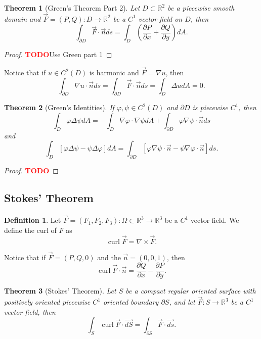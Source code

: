 \documentclass{article}
\theoremstyle{plain}
\newtheorem{theorem}{Theorem}[subsection]
\theoremstyle{definition}
\newtheorem*{definition}{Definition}
\newcommand{\R}{\mathbb{R}}
\DeclareMathOperator{\curl}{curl}
\newcommand{\td}{\textcolor{red}{\textbf{TODO}}}
\begin{document}
\begin{theorem}[Green's Theorem Part 2]
    Let $D \subset \R^2$ be a piecewise smooth domain and $\vec{F} = (P, Q) : D \to \R^2$ be a $C^1$ vector field on $D$, then
    $$\int_{\partial D}\vec{F}\cdot \vec{n}ds = \int_D \left(\frac{\partial P}{\partial x} + \frac{\partial Q}{\partial y}\right)dA.$$
\end{theorem}

\begin{proof}
    \td Use Green part 1
\end{proof}

Notice that if $u \in C^2(D)$ is harmonic and $\vec{F} = \nabla u$, then 
$$\int_{\partial D}\nabla u \cdot \vec{n} ds = \int_{\partial D} \vec{F}\cdot \vec{n} ds = \int_D \Delta u dA = 0.$$

\begin{theorem}[Green's Identities]
    If $\varphi, \psi \in C^2(D)$ and $\partial D$ is piecewise $C^1$, then
    $$\int_D \varphi \Delta \psi dA = - \int_D \nabla \varphi \cdot \nabla \psi dA + \int_{\partial D} \varphi \nabla \psi \cdot \vec{n} ds$$
    and 
    $$\int_D [\varphi \Delta \psi - \psi \Delta \varphi]dA = \int_{\partial D}[\varphi \nabla \psi \cdot \vec{n} - \psi \nabla \varphi \cdot \vec{n}]ds.$$
\end{theorem}

\begin{proof}
    \td 
\end{proof}

\subsection{Stokes' Theorem}

\begin{definition}
    Let $\vec{F} = (F_1, F_2, F_3) : \Omega \subset \R^3 \to \R^3$ be a $C^1$ vector field. We define the curl of $F$ as
    $$\curl \vec{F} = \nabla \times \vec{F}.$$
\end{definition}

Notice that if $\vec{F} = (P, Q, 0)$ and the $\vec{n} = (0,0,1)$, then
$$\curl \vec{F} \cdot \vec{n} = \frac{\partial Q}{\partial x} - \frac{\partial P}{\partial y}.$$

\begin{theorem}[Stokes' Theorem]
    Let $S$ be a compact regular oriented surface with positively oriented piecewise $C^1$ oriented boundary $\partial S$, and let $\vec{F} : S \to \R^3$ be a $C^1$ vector field, then
    $$\int_S \curl \vec{F} \cdot \vec{dS} = \int_{\partial S} \vec{F} \cdot \vec{ds}.$$
\end{theorem}
\end{document}
